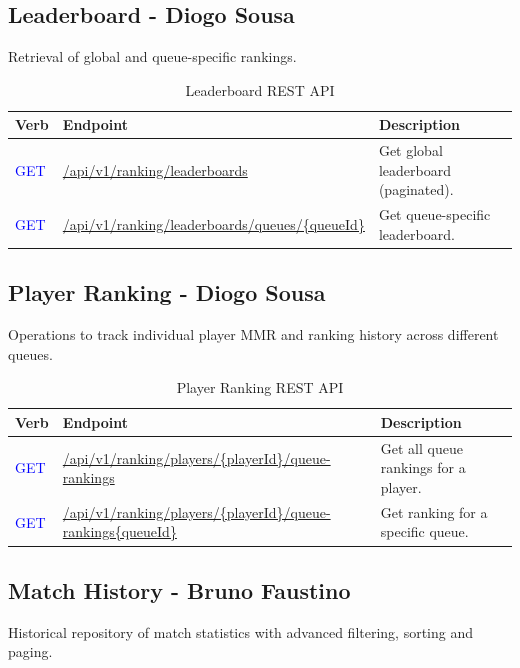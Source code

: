 \documentclass[11pt,a4paper]{article}
\newcommand{\getapi}{\textcolor{blue}{GET}}
\newcommand{\ranking}[1]{/api/v1/ranking#1}
\newcommand{\bff}[1]{\textbf{#1}}
\begin{document}
 \subsection{Leaderboard - Diogo Sousa}

 Retrieval of global and queue-specific rankings.

 \begin{table}[H]
 \begin{tabular}{|p{2cm}|p{5cm}|p{7cm}|}
 \hline
 \bff{Verb} & \bff{Endpoint}         & \bff{Description} \\ \hline
 \getapi & \url{\ranking{/leaderboards}}      & Get global leaderboard (paginated). \\ \hline
 \getapi & \url{\ranking{/leaderboards/queues/{queueId}}} & Get queue-specific leaderboard. \\ \hline
 \end{tabular}
 \caption{Leaderboard REST API}
 \label{tab:api-leaderboard}
 \end{table}

 \subsection{Player Ranking - Diogo Sousa}

 Operations to track individual player MMR and ranking history across different queues.

 \begin{table}[H]
 \begin{tabular}{|p{2cm}|p{5cm}|p{7cm}|}
 \hline
 \bff{Verb} & \bff{Endpoint}             & \bff{Description} \\ \hline
 \getapi & \url{\ranking{/players/{playerId}/queue-rankings}}    & Get all queue rankings for a player. \\ \hline
 \getapi & \url{\ranking{/players/{playerId}/queue-rankings{queueId}}} & Get ranking for a specific queue. \\ \hline
 \end{tabular}
 \caption{Player Ranking REST API}
 \label{tab:api-player-ranking}
 \end{table}

 \subsection{Match History - Bruno Faustino}

 Historical repository of match statistics with advanced filtering, sorting and paging.
\end{document}
